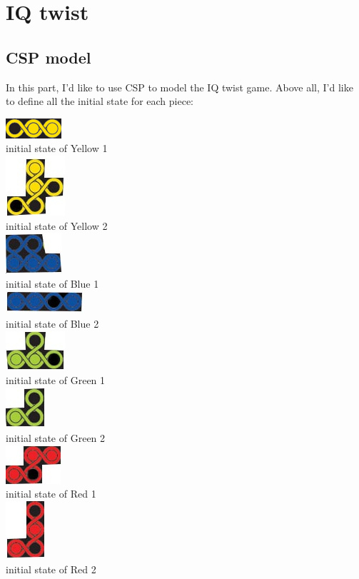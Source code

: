 \section{IQ twist}
\label{sec:IQ twist}
\subsection{CSP model}
\label{sec:CSP model}
In this part, I'd like to use CSP to model the IQ twist game. Above all, I'd like to define all the initial state for each piece:
\begin{center}\includegraphics{Yellow1.png} 
\\initial state of Yellow 1
\\\includegraphics{yellow2.jpg}
\\initial state of Yellow 2
\\\includegraphics{blue1.jpg}
\\initial state of Blue 1
\\\includegraphics{blue2.jpg}
\\initial state of Blue 2
\\\includegraphics{green1.jpg}
\\initial state of Green 1 
\\\includegraphics{green2.jpg}
\\initial state of Green 2
\\\includegraphics{red1.jpg}
\\initial state of Red 1 
\\\includegraphics{red2.jpg}
\\initial state of Red 2 
\end{center}
